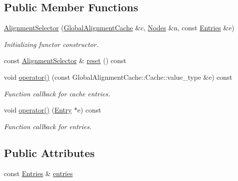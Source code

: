 \subsection*{Public Member Functions}
\begin{DoxyCompactItemize}
\item 
\hyperlink{class_d_d4hep_1_1_alignments_1_1_alignment_selector_a00da94ed989a3b504636f2c22ad6641e}{AlignmentSelector} (\hyperlink{class_d_d4hep_1_1_alignments_1_1_global_alignment_cache}{GlobalAlignmentCache} \&c, \hyperlink{class_d_d4hep_1_1_alignments_1_1_alignment_operator_a2f25eae1d38abc30a09f7a840ab0662a}{Nodes} \&n, const \hyperlink{class_d_d4hep_1_1_alignments_1_1_alignment_operator_ada83b10531c5774c75f6e8c224f55f4c}{Entries} \&e)
\begin{DoxyCompactList}\small\item\em Initializing functor constructor. \item\end{DoxyCompactList}\item 
const \hyperlink{class_d_d4hep_1_1_alignments_1_1_alignment_selector}{AlignmentSelector} \& \hyperlink{class_d_d4hep_1_1_alignments_1_1_alignment_selector_ab8422a79dc1c5d79309d68ca2d554584}{reset} () const 
\item 
void \hyperlink{class_d_d4hep_1_1_alignments_1_1_alignment_selector_adc9ad4c93f7ee53394ce4bfba81d8283}{operator()} (const GlobalAlignmentCache::Cache::value\_\-type \&e) const 
\begin{DoxyCompactList}\small\item\em Function callback for cache entries. \item\end{DoxyCompactList}\item 
void \hyperlink{class_d_d4hep_1_1_alignments_1_1_alignment_selector_a2aeb642263c81aa468c218bc67fa70d6}{operator()} (\hyperlink{struct_d_d4hep_1_1_alignments_1_1_alignment_stack_1_1_stack_entry}{Entry} $\ast$e) const 
\begin{DoxyCompactList}\small\item\em Function callback for entries. \item\end{DoxyCompactList}\end{DoxyCompactItemize}
\subsection*{Public Attributes}
\begin{DoxyCompactItemize}
\item 
const \hyperlink{class_d_d4hep_1_1_alignments_1_1_alignment_operator_ada83b10531c5774c75f6e8c224f55f4c}{Entries} \& \hyperlink{class_d_d4hep_1_1_alignments_1_1_alignment_selector_ab948717c701b7aff5c744f8624cf8473}{entries}
\end{DoxyCompactItemize}


